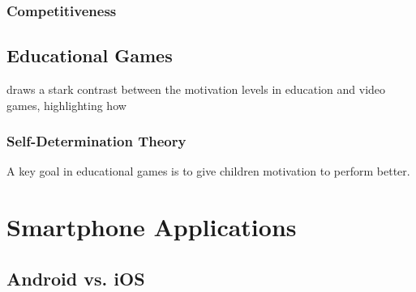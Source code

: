 \subsubsection{Competitiveness}

\subsection{Educational Games}
\cite{Denis:2005:MEG:1178477.1178581} draws a stark contrast between the motivation levels in education and video games, highlighting how 

\subsubsection{Self-Determination Theory}
A key goal in educational games is to give children motivation to perform better.


\section{Smartphone Applications}

\subsection{Android vs. iOS}
